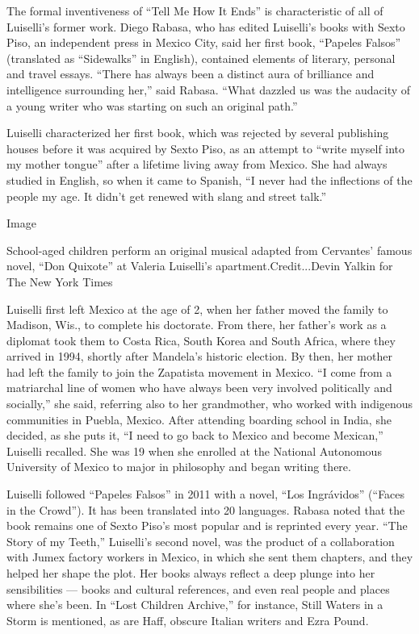 The formal inventiveness of ``Tell Me How It Ends'' is characteristic of
all of Luiselli's former work. Diego Rabasa, who has edited Luiselli's
books with Sexto Piso, an independent press in Mexico City, said her
first book, ``Papeles Falsos'' (translated as ``Sidewalks'' in English),
contained elements of literary, personal and travel essays. ``There has
always been a distinct aura of brilliance and intelligence surrounding
her,'' said Rabasa. ``What dazzled us was the audacity of a young writer
who was starting on such an original path.''

Luiselli characterized her first book, which was rejected by several
publishing houses before it was acquired by Sexto Piso, as an attempt to
``write myself into my mother tongue'' after a lifetime living away from
Mexico. She had always studied in English, so when it came to Spanish,
``I never had the inflections of the people my age. It didn't get
renewed with slang and street talk.''

Image

School-aged children perform an original musical adapted from Cervantes'
famous novel, ``Don Quixote'' at Valeria Luiselli's
apartment.Credit...Devin Yalkin for The New York Times

Luiselli first left Mexico at the age of 2, when her father moved the
family to Madison, Wis., to complete his doctorate. From there, her
father's work as a diplomat took them to Costa Rica, South Korea and
South Africa, where they arrived in 1994, shortly after Mandela's
historic election. By then, her mother had left the family to join the
Zapatista movement in Mexico. ``I come from a matriarchal line of women
who have always been very involved politically and socially,'' she said,
referring also to her grandmother, who worked with indigenous
communities in Puebla, Mexico. After attending boarding school in India,
she decided, as she puts it, ``I need to go back to Mexico and become
Mexican,'' Luiselli recalled. She was 19 when she enrolled at the
National Autonomous University of Mexico to major in philosophy and
began writing there.

Luiselli followed ``Papeles Falsos'' in 2011 with a novel, ``Los
Ingrávidos'' (``Faces in the Crowd''). It has been translated into 20
languages. Rabasa noted that the book remains one of Sexto Piso's most
popular and is reprinted every year. ``The Story of my Teeth,''
Luiselli's second novel, was the product of a collaboration with Jumex
factory workers in Mexico, in which she sent them chapters, and they
helped her shape the plot. Her books always reflect a deep plunge into
her sensibilities --- books and cultural references, and even real
people and places where she's been. In ``Lost Children Archive,'' for
instance, Still Waters in a Storm is mentioned, as are Haff, obscure
Italian writers and Ezra Pound.

